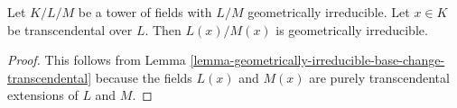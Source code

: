 \begin{lemma}
\label{lemma-geometrically-irreducible-add-transcendental}
Let $K/L/M$ be a tower of fields with $L/M$ geometrically irreducible.
Let $x \in K$ be transcendental over $L$. Then $L(x)/M(x)$ is geometrically
irreducible.
\end{lemma}

\begin{proof}
This follows from
Lemma \ref{lemma-geometrically-irreducible-base-change-transcendental}
because the fields $L(x)$ and $M(x)$ are purely transcendental
extensions of $L$ and $M$.
\end{proof}